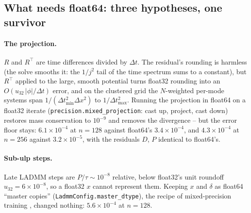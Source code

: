 \documentclass[11pt]{article}
\newcommand{\dt}{\Delta t}
\newcommand{\dx}{\Delta x}
\newcommand{\code}[1]{\texttt{#1}}
\begin{document}
\subsection{What needs float64: three hypotheses, one survivor}

\paragraph{The projection.} $R$ and $R^{\!\top}$ are time differences divided by $\dt$.
The residual's rounding is harmless (the solve smooths it: the $1/j^2$ tail of the time
spectrum sums to a constant), but $R^{\!\top}$ applied to the large, smooth potential
turns float32 rounding into an $O(u_{32}\,|\phi|/\dt)$ error, and on the clustered grid
the $N$-weighted per-mode systems span $1/(\dt_{\min}^2\dx^2)$ to $1/\dt_{\max}^2$.
Running the projection in float64 on a float32 iterate (\code{precision.mixed\_projection}:
cast up, project, cast down) restores mass conservation to $10^{-9}$ and removes the
divergence -- but the error floor stays: $6.1\times10^{-4}$ at $n=128$ against float64's
$3.4\times10^{-4}$, and $4.3\times10^{-4}$ at $n=256$ against $3.2\times10^{-5}$, with
the residuals $D$, $P$ identical to float64's.

\paragraph{Sub-ulp steps.} Late LADMM steps are $P/\tau\sim10^{-8}$ relative, below
float32's unit roundoff $u_{32}=6\times10^{-8}$, so a float32 $x$ cannot represent them.
Keeping $x$ and $\delta$ as float64 ``master copies'' (\code{LadmmConfig.master\_dtype}),
the recipe of mixed-precision training \cite{micikevicius2018}, changed nothing:
$5.6\times10^{-4}$ at $n=128$.
\end{document}
